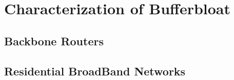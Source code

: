 \documentclass[letter, 11pt]{article}
\begin{document}
\section{Characterization of Bufferbloat}

\subsection{Backbone Routers}


\subsection{Residential BroadBand Networks}



{}
\end{document}
